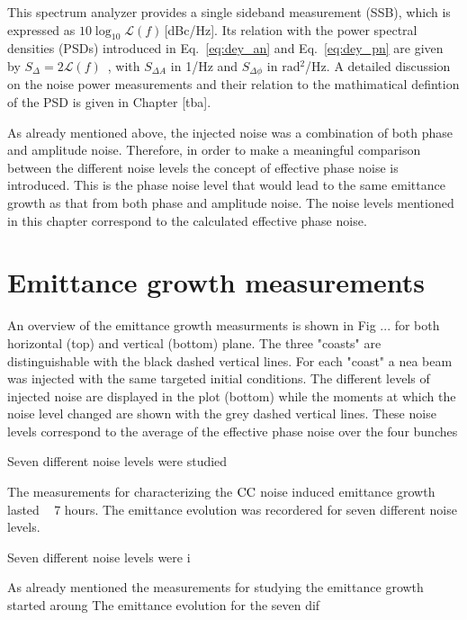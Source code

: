 \begin{sloppypar} %
This spectrum analyzer provides a single sideband measurement (SSB), which is expressed as $10\log_{10}\mathcal{L}(f)$\,[dBc/Hz]. Its relation with the power spectral densities (PSDs) introduced in Eq.~\eqref{eq:dey_an} and Eq.~\eqref{eq:dey_pn} are given by $S_\Delta = 2\mathcal{L}(f)$~\cite{IEEE:4797525}, with $S_{\Delta A}$ in 1/Hz and $S_{\Delta\phi}$ in rad$^2$/Hz. A detailed discussion on the noise power measurements and their relation to the mathimatical defintion of the PSD is given in Chapter [tba].

As already mentioned above, the injected noise was a combination of both phase and amplitude noise. Therefore, in order to make a meaningful comparison between the different noise levels the concept of effective phase noise is introduced. This is the phase noise level that would lead to
the same emittance growth as that from both phase and
amplitude noise. The noise levels mentioned in this chapter correspond to the calculated effective phase noise.
\end{sloppypar} 



\section{Emittance growth measurements}\label{sec:EmitGrowth_measurements}

An overview of the emittance growth measurments is shown in Fig ... for both horizontal (top) and vertical (bottom) plane. The three "coasts" are distinguishable with the black dashed vertical lines. For each "coast" a nea beam was injected with the same targeted initial conditions. The different levels of injected noise are displayed in the plot (bottom) while the moments at which the noise level changed are shown with the grey dashed vertical lines. These noise levels correspond to the average of the effective phase noise over the four bunches



Seven different noise levels were studied

The measurements for characterizing the ${\mathrm{CC}}$ noise induced emittance growth lasted ~ 7 hours. The emittance evolution was recordered for seven different noise levels. 

Seven different noise levels were i


As already mentioned the measurements for studying the emittance growth started aroung
The emittance evolution for the seven dif

